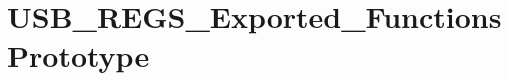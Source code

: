 \hypertarget{group___u_s_b___r_e_g_s___exported___functions_prototype}{\section{U\-S\-B\-\_\-\-R\-E\-G\-S\-\_\-\-Exported\-\_\-\-Functions\-Prototype}
\label{group___u_s_b___r_e_g_s___exported___functions_prototype}
}
